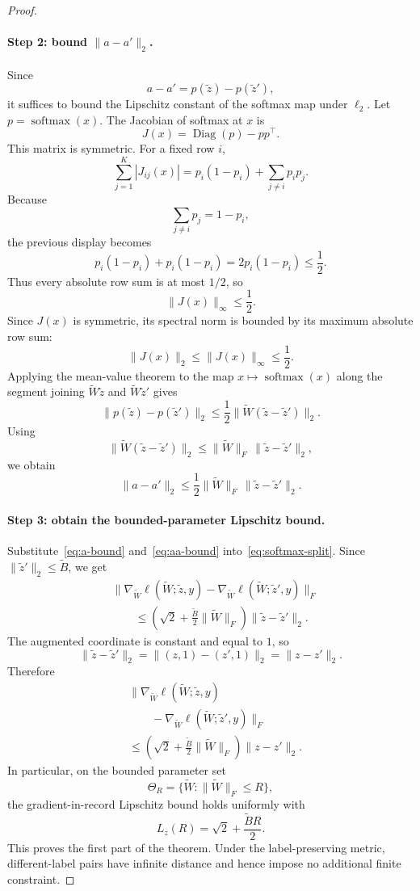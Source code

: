 \documentclass[11pt,a4paper]{report}
\theoremstyle{plain}
\theoremstyle{definition}
\theoremstyle{remark}
\DeclareMathOperator{\softmax}{softmax}
\begin{document}
\begin{proof}
\paragraph{Step 2: bound $\|a-a'\|_2$.}
Since
\[
a-a'=p(\widetilde z)-p(\widetilde z'),
\]
it suffices to bound the Lipschitz constant of the softmax map under $\ell_2$. Let $p=\softmax(x)$. The Jacobian of softmax at $x$ is
\[
J(x)=\operatorname{Diag}(p)-pp^\top.
\]
This matrix is symmetric. For a fixed row $i$,
\[
\sum_{j=1}^K |J_{ij}(x)|
=
p_i(1-p_i)+\sum_{j\neq i}p_ip_j.
\]
Because
\[
\sum_{j\neq i}p_j=1-p_i,
\]
the previous display becomes
\[
p_i(1-p_i)+p_i(1-p_i)
=
2p_i(1-p_i)
\le
\frac{1}{2}.
\]
Thus every absolute row sum is at most $1/2$, so
\[
\|J(x)\|_\infty\le \frac{1}{2}.
\]
Since $J(x)$ is symmetric, its spectral norm is bounded by its maximum absolute row sum:
\[
\|J(x)\|_2\le \|J(x)\|_\infty\le \frac{1}{2}.
\]
Applying the mean-value theorem to the map $x\mapsto\softmax(x)$ along the segment joining $\widetilde W\widetilde z$ and $\widetilde W\widetilde z'$ gives
\[
\|p(\widetilde z)-p(\widetilde z')\|_2
\le
\frac{1}{2}\|\widetilde W(\widetilde z-\widetilde z')\|_2.
\]
Using
\[
\|\widetilde W(\widetilde z-\widetilde z')\|_2
\le
\|\widetilde W\|_F\,\|\widetilde z-\widetilde z'\|_2,
\]
we obtain
\begin{equation}
\label{eq:aa-bound}
\|a-a'\|_2
\le
\frac{1}{2}\|\widetilde W\|_F\,\|\widetilde z-\widetilde z'\|_2.
\end{equation}

\paragraph{Step 3: obtain the bounded-parameter Lipschitz bound.}
Substitute~\eqref{eq:a-bound} and~\eqref{eq:aa-bound} into~\eqref{eq:softmax-split}. Since $\|\widetilde z'\|_2\le \widetilde B$, we get
\[
\begin{aligned}
&\bigl\|
\nabla_{\widetilde W}\ell(\widetilde W;\widetilde z,y)
-
\nabla_{\widetilde W}\ell(\widetilde W;\widetilde z',y)
\bigr\|_F \\
&\qquad\le
\left(
\sqrt{2}
+
\frac{\widetilde B}{2}\|\widetilde W\|_F
\right)
\|\widetilde z-\widetilde z'\|_2 .
\end{aligned}
\]
The augmented coordinate is constant and equal to $1$, so
\[
\|\widetilde z-\widetilde z'\|_2
=
\|(z,1)-(z',1)\|_2
=
\|z-z'\|_2.
\]
Therefore
\[
\begin{aligned}
&\bigl\|
\nabla_{\widetilde W}\ell(\widetilde W;\widetilde z,y) \\
&\qquad -
\nabla_{\widetilde W}\ell(\widetilde W;\widetilde z',y)
\bigr\|_F \\
&\le
\left(
\sqrt{2}
+
\frac{\widetilde B}{2}\|\widetilde W\|_F
\right)
\|z-z'\|_2.
\end{aligned}
\]
In particular, on the bounded parameter set
\[
\Theta_R
=
\{\widetilde W:\|\widetilde W\|_F\le R\},
\]
the gradient-in-record Lipschitz bound holds uniformly with
\[
L_z(R)
=
\sqrt{2}+\frac{\widetilde B R}{2}.
\]
This proves the first part of the theorem. Under the label-preserving metric, different-label pairs have infinite distance and hence impose no additional finite constraint.


\end{proof}
\end{document}
